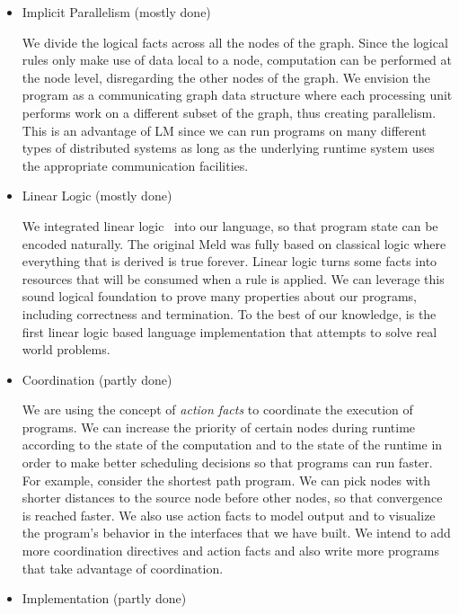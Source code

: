 \begin{itemize}
   \item Implicit Parallelism (mostly done)
   
   We divide the logical facts across all the nodes of the graph. Since the
   logical rules only make use of data local to a node, computation can be performed at the
   node level, disregarding the other nodes of the graph. We envision the program as
   a communicating graph data structure where each processing unit performs work on a different subset of the graph,
   thus creating parallelism. This is an advantage of LM since we can run programs on many different types
   of distributed systems as long as the underlying runtime system uses the appropriate communication facilities.
   
   \item Linear Logic (mostly done)

   We integrated linear logic~\cite{Girard95logic:its} into our language, so that program state
   can be encoded naturally. The original Meld was fully based on classical logic where everything that
   is derived is true forever. Linear logic turns some facts into resources that will be consumed when a rule is applied. We can leverage this sound logical foundation to prove many properties about our programs, including correctness and termination. To the best of our knowledge, \lang is the first
   linear logic based language implementation that attempts to solve real world problems.

   \item Coordination (partly done)
   
   We are using the concept of \emph{action facts} to coordinate the execution of programs.
   We can increase the priority of certain nodes during runtime according to the state of the
   computation and to the state of the runtime in order to make better scheduling decisions
   so that programs can run faster.
   For example, consider the shortest path program. We can pick nodes with shorter
   distances to the source node before other nodes, so that convergence is reached faster.
   We also use action facts to model output and to visualize the program's behavior in the
   interfaces that we have built. We intend to add more coordination directives and action facts
   and also write more programs that take advantage of coordination.

   \item Implementation (partly done)


\end{itemize}
